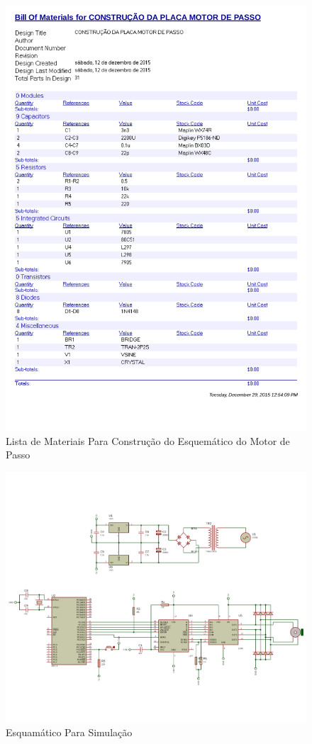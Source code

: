 \documentclass{Fabiano_file}
\begin{document}
{\begin{figure}[h!]
\centering
\includegraphics[width=.5\textwidth]{lista_de_materiais.pdf}
\caption{Lista de Materiais Para Construção do Esquemático do Motor de Passo}
\label{fig:lista_de_materiais}
\end{figure}

	\newpage
	\clearpage
	\begin{figure}
		\centering
		\includegraphics[width=.9\linewidth]{esquematico_do_motor_de_passo_para_simulacao}
		\caption{Esquamático Para Simulação}
	\end{figure}
	\clearpage
	\newpage
	
}
\end{document}
